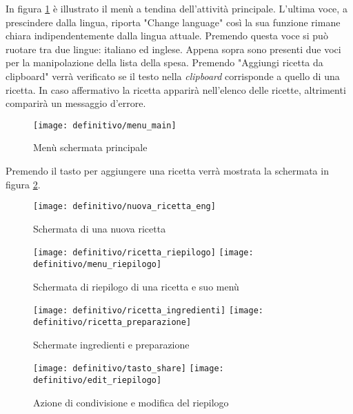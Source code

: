 In figura \ref{fig:def_main_2} è illustrato il menù a tendina dell'attività principale.
L'ultima voce, a prescindere dalla lingua, riporta "Change language" così la sua funzione rimane chiara indipendentemente dalla lingua attuale.
Premendo questa voce si può ruotare tra due lingue: italiano ed inglese.
Appena sopra sono presenti due voci per la manipolazione della lista della spesa.
Premendo "Aggiungi ricetta da clipboard" verrà verificato se il testo nella \textit{clipboard} corrisponde a quello di una ricetta.
In caso affermativo la ricetta apparirà nell'elenco delle ricette, altrimenti comparirà un messaggio d'errore.

\begin{figure}[ht]
  \begin{center}
    \texttt{[image: definitivo/menu\_main]}
    \caption{Menù schermata principale}
    \label{fig:def_main_2}
  \end{center}
\end{figure}
\clearpage

Premendo il tasto per aggiungere una ricetta verrà mostrata la schermata in figura \ref{fig:def_nuova}.
\begin{figure}[ht]
  \begin{center}
    \texttt{[image: definitivo/nuova\_ricetta\_eng]}
    \caption{Schermata di una nuova ricetta}
    \label{fig:def_nuova}
  \end{center}
\end{figure}

\begin{figure}[ht]
  \begin{center}
    \texttt{[image: definitivo/ricetta\_riepilogo]}
    \texttt{[image: definitivo/menu\_riepilogo]}
    \caption{Schermata di riepilogo di una ricetta e suo menù}
    \label{fig:def_ricetta}
  \end{center}
\end{figure}

\begin{figure}[ht]
  \begin{center}
    \texttt{[image: definitivo/ricetta\_ingredienti]}
    \texttt{[image: definitivo/ricetta\_preparazione]}
    \caption{Schermate ingredienti e preparazione}
    \label{fig:def_ricetta_1}
  \end{center}
\end{figure}

\begin{figure}[ht]
   \begin{center}
    \texttt{[image: definitivo/tasto\_share]}
    \texttt{[image: definitivo/edit\_riepilogo]}
    \caption{Azione di condivisione e modifica del riepilogo}
    \label{fig:def_ricetta_2}
  \end{center}
\end{figure}


